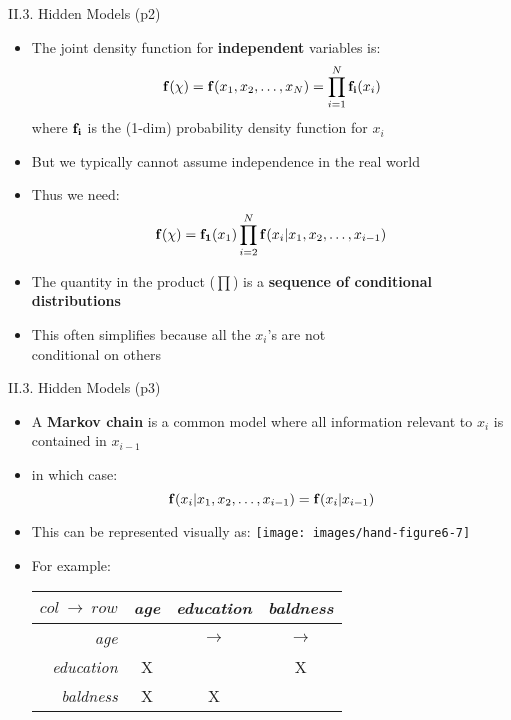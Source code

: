 \documentclass[handout]{beamer}
\newcommand{\strong}[1]{\textbf{\color{teal} #1}}
\newcommand{\stronger}[1]{\textbf{\color{purple} #1}}
\begin{document}
\begin{frame}{II.3. Hidden Models (p2)}
\begin{itemize}
\item The joint density function for \strong{independent} variables is:
\[
	{\bf f}(\chi) = {\bf f}(x_1,x_2,\ldots,x_N) = \prod_{i=1}^{N}{{\bf f_i}(x_i)}
\]
where ${\bf f_i}$ is the (1-dim) probability density function for $x_i$
\item But we typically cannot assume independence in the real world
\item Thus we need:
\[
	{\bf f}(\chi) = {\bf f_1}(x_1) \prod_{i=2}^{N}{ {\bf f}(x_i|x_1,x_2,\ldots,x_{i-1})}
\]
\item The quantity in the product ($\prod$) is a \strong{sequence of conditional distributions}
\item This often simplifies because all the $x_i$'s are not\\
 conditional on others
\end{itemize}
\end{frame}
\begin{frame}{II.3. Hidden Models (p3)}
\begin{itemize}
\item A \stronger{Markov chain} is a common model where all information relevant to $x_i$ is contained in $x_{i-1}$
\item in which case:
\[
{\bf f}(x_i|x_1,x_2,\ldots,x_{i-1}) = {\bf f}(x_i | x_{i-1})
\]
\item This can be represented visually as:
\texttt{[image: images/hand-figure6-7]}
\item For example:
\begin{center}
\begin{tabular}{r||c|c|c|}
$col~\rightarrow~row$    & \emph{age} & \emph{education} & \emph{baldness} \\
\hline
\hline
\emph{age}       &            & $\rightarrow$    & $\rightarrow$ \\
\hline
\emph{education} & X          &                  & X \\
\hline
\emph{baldness}  & X          & X                & \\
\hline
\end{tabular}
\end{center}
\end{itemize}
\end{frame}
\end{document}
